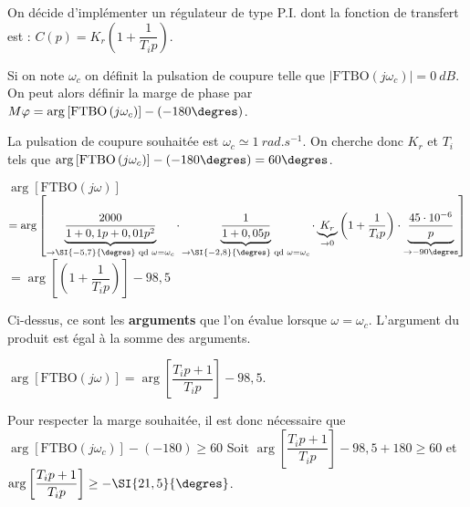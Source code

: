 On décide d’implémenter un régulateur de type P.I. dont la fonction de transfert
est : $C(p)=K_r\left(1+\dfrac{1}{T_i p} \right)$.



\begin{methode}
Si on note $\omega_c$ on définit la pulsation de coupure telle que $|\text{FTBO}\left(j \omega_c \right)| = \SI{0}{dB}$. On peut alors définir la marge de phase par $M\varphi=\arg \left[\text{FTBO}\left( j \omega_c\right)\right]-\left(-180\degres\right)$.
\end{methode}



\ifprof
\begin{corrige}
La pulsation de coupure souhaitée est $\omega_c \simeq \SI{1}{rad.s^{-1}}$. 
On cherche donc $K_r$ et $T_i$ tels que $\arg \left[\text{FTBO}\left( j \omega_c\right)\right]-\left(-180\degres\right)=60\degres$.

$\arg \left[\text{FTBO}\left( j \omega\right)\right]$ 
$ = \arg \left[
\underbrace{\dfrac{2000}{1+0,1p+0,01p^2}}_{\to \SI{-5,7}{\degres} \text{ qd } \omega=\omega_c} 
\cdot
\underbrace{\dfrac{1}{1+0,05p}}_{\to \SI{-2,8}{\degres} \text{ qd } \omega=\omega_c} 
\cdot 
 \underbrace{K_r}_{\to 0}
 \left(1+\dfrac{1}{T_i p} \right) \cdot 
\underbrace{\dfrac{45\cdot 10^{-6}}{p}}_{\to -90\degres } 
\right] $
$ = \arg \left[  \left(1+\dfrac{1}{T_i p} \right) \right] -98,5$

\begin{remarque}
Ci-dessus, ce sont les \textbf{arguments} que l'on évalue lorsque $\omega=\omega_c$. L'argument du produit est égal à la somme des arguments.
\end{remarque}
$ \arg \left[\text{FTBO}\left( j \omega\right)\right] = \arg \left[  \dfrac{T_i p+1}{T_i p}  \right]-98,5 $.

Pour respecter la marge souhaitée, il est donc nécessaire que 
$\arg \left[\text{FTBO}\left( j \omega_c\right)\right]-\left(-180\right)\geq60$
Soit 
$\arg \left[  \dfrac{T_i p+1}{T_i p}  \right]-98,5+ 180 \geq60$ 
et $\arg \left[  \dfrac{T_i p+1}{T_i p}  \right] \geq - \SI{21,5}{\degres}$.
 
\end{corrige}
\else
\fi


